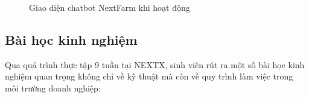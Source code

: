 \begin{figure}[H]
    \centering
    \caption{Giao diện chatbot NextFarm khi hoạt động}
    \label{fig:giao-dien-chat}
\end{figure}

\subsection{Bài học kinh nghiệm}

Qua quá trình thực tập 9 tuần tại NEXTX, sinh viên rút ra một số bài học kinh nghiệm quan trọng không chỉ về kỹ thuật mà còn về quy trình làm việc trong môi trường doanh nghiệp:

